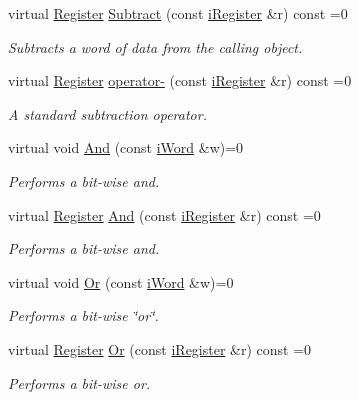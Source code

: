 \begin{DoxyCompactItemize}
virtual \hyperlink{classRegister}{Register} \hyperlink{classiRegister_ad7eb424400d184f1829664dd4f87ce5c}{Subtract} (const \hyperlink{classiRegister}{iRegister} \&r) const =0
\begin{DoxyCompactList}\small\item\em Subtracts a word of data from the calling object. \item\end{DoxyCompactList}\item 
virtual \hyperlink{classRegister}{Register} \hyperlink{classiRegister_a01f837097cb87ec33fdc1cef606e1842}{operator-\/} (const \hyperlink{classiRegister}{iRegister} \&r) const =0
\begin{DoxyCompactList}\small\item\em A standard subtraction operator. \item\end{DoxyCompactList}\item 
virtual void \hyperlink{classiRegister_ae8114106e70653a705f04ba3892ed9e1}{And} (const \hyperlink{classiWord}{iWord} \&w)=0
\begin{DoxyCompactList}\small\item\em Performs a bit-\/wise and. \item\end{DoxyCompactList}\item 
virtual \hyperlink{classRegister}{Register} \hyperlink{classiRegister_aa9a15ebfeea1e5857a1098b73cc583ad}{And} (const \hyperlink{classiRegister}{iRegister} \&r) const =0
\begin{DoxyCompactList}\small\item\em Performs a bit-\/wise and. \item\end{DoxyCompactList}\item 
virtual void \hyperlink{classiRegister_aa0eac4fe58bde4a280a42fda1c087eee}{Or} (const \hyperlink{classiWord}{iWord} \&w)=0
\begin{DoxyCompactList}\small\item\em Performs a bit-\/wise \char`\"{}or\char`\"{}. \item\end{DoxyCompactList}\item 
virtual \hyperlink{classRegister}{Register} \hyperlink{classiRegister_af5f065e89ef31d2ed40a1e80d9231bfd}{Or} (const \hyperlink{classiRegister}{iRegister} \&r) const =0
\begin{DoxyCompactList}\small\item\em Performs a bit-\/wise or. \item\end{DoxyCompactList}\item 

\end{DoxyCompactItemize}
